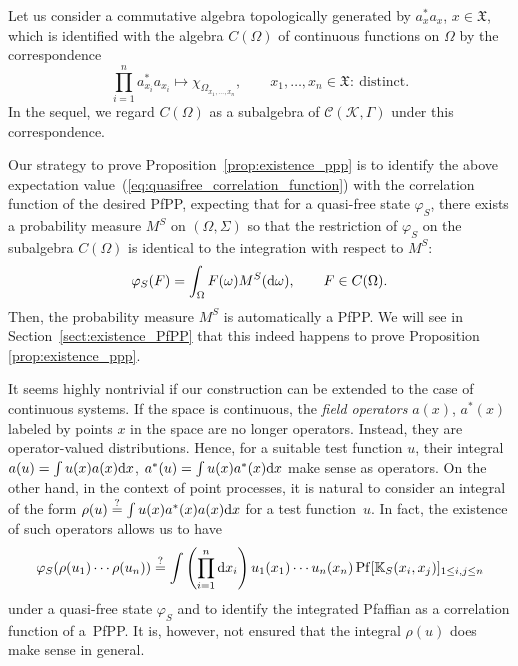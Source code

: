 \documentclass[pdftex]{sigma}
\numberwithin{equation}{section}
\newcommand{\pf}{\operatorname{Pf}}
\newcommand{\mfrak}[1]{\mathfrak{#1}}
\newcommand{\mcal}[1]{\mathcal{#1}}
\newcommand{\mbb}[1]{\mathbb{#1}}
\begin{document}
Let us consider a commutative algebra topologically generated by $a_{x}^{\ast}a_{x}$, $x\in\mfrak{X}$, which is identified with the algebra $C(\Omega)$ of continuous functions on $\Omega$ by the correspondence
\begin{equation*}
	\prod_{i=1}^{n}a_{x_{i}}^{\ast}a_{x_{i}}\mapsto \chi_{\Omega_{x_{1},\dots, x_{n}}},\qquad x_{1},\dots, x_{n}\in\mfrak{X}\colon \ \mbox{distinct.}
\end{equation*}
In the sequel, we regard $C(\Omega)$ as a subalgebra of $\mcal{C}(\mcal{K},\Gamma)$ under this correspondence.

Our strategy to prove Proposition~\ref{prop:existence_ppp} is to identify the above expectation value~(\ref{eq:quasifree_correlation_function}) with the correlation function of the desired PfPP, expecting that for a quasi-free state $\varphi_{S}$, there exists a probability measure $M^{S}$ on $(\Omega,\Sigma)$ so that the restriction of $\varphi_{S}$ on the subalgebra $C(\Omega)$ is identical to the integration with respect to $M^{S}$:
\begin{equation*}
	\varphi_{S}(F)=\int_{\Omega}F(\omega)M^{S}({\rm d}\omega),\qquad F\in C(\Omega).
\end{equation*}
Then, the probability measure $M^{S}$ is automatically a PfPP.
We will see in Section~\ref{sect:existence_PfPP} that this indeed happens to prove Proposition \ref{prop:existence_ppp}.

\begin{Remark}
It seems highly nontrivial if our construction can be extended to the case of continuous systems. If the space is continuous, the {\it field operators} $a(x)$, $a^{\ast}(x)$ labeled by points $x$ in the space are no longer operators. Instead, they are operator-valued distributions. Hence, for a suitable test function $u$, their integral $a(u)=\int u(x)a(x){\rm d}x$, $a^{\ast}(u)=\int u(x)a^{\ast}(x){\rm d}x$ make sense as operators. On the other hand, in the context of point processes, it is natural to consider an integral of the form $\rho (u)\overset{?}{=}\int u(x)a^{\ast}(x)a(x){\rm d}x$ for a test function~$u$. In fact, the existence of such operators allows us to have
\begin{equation*}
	\varphi_{S} (\rho (u_{1})\cdots \rho (u_{n}) )\overset{?}{=}\int \left(\prod_{i=1}^{n}{\rm d}x_{i}\right)u_{1}(x_{1})\cdots u_{n}(x_{n})\pf [\mbb{K}_{S}(x_{i},x_{j})]_{1\le i,j\le n}
\end{equation*}
under a quasi-free state $\varphi_{S}$ and to identify the integrated Pfaffian as a correlation function of a~PfPP. It is, however, not ensured that the integral $\rho (u)$ does make sense in general.
\end{Remark}
\end{document}

